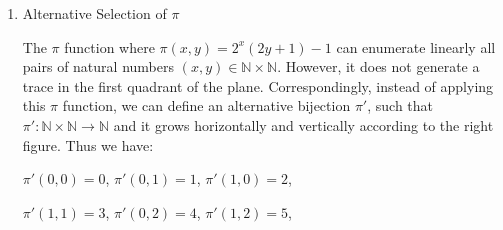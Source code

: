 \documentclass[12pt,a4paper]{article}
\theoremstyle{definition}
\numberwithin{equation}{section}
\numberwithin{figure}{section}
\begin{document}
\begin{enumerate}
\begin{enumerate}
\item (Cantor) Show that the set of all functions from $\mathbb{N}$ to $\mathbb{N}$ is not denumerable.
\begin{proof}
Define $\mathcal{F}$ as all the functions maps $\mathbb{N}$ to $\mathbb{N}$. Let $f_0$, $f_1$, $f_2$, . . . be any
sequence of elements of $\mathcal{F}$ and by Cantor's Diagonal Method, we can define $f \in  \mathcal{F}$ by: \\
\begin{displaymath}
f(i) = \left\{ \begin{array}{ll}
f_i(i)+1 & \textrm{if $f_i(n)$ is defined}\\
0 & \textrm{otherwise} 
\end{array} \right.
\end{displaymath}

\end{proof}
\item Show that the set of all non-computable total functions from $\mathbb{N}$ to $\mathbb{N}$ is not denumerable.
\end{enumerate}

\item Alternative Selection of $\pi$

  \begin{minipage}[t]{0.68\linewidth}
  The $\pi$ function where $\pi(x,y)=2^x (2y+1)-1$ can enumerate linearly all pairs of natural numbers $ (x,y) \in \mathbb{N}\times \mathbb{N}$. However, it does not generate a trace in the first quadrant of the plane. Correspondingly, instead of applying this $\pi$ function, we can define an alternative bijection $\pi'$, such that $\pi': \mathbb{N}\times \mathbb{N} \rightarrow \mathbb{N}$ and it grows horizontally and vertically according to the right figure. Thus we have:

    \vspace{1mm}
  $\pi'(0,0)=0$, $\pi'(0,1)=1$, $\pi'(1,0)=2$,

  $\pi'(1,1)=3$, $\pi'(0,2)=4$, $\pi'(1,2)=5$, 


\end{minipage}
\end{enumerate}
\end{document}
